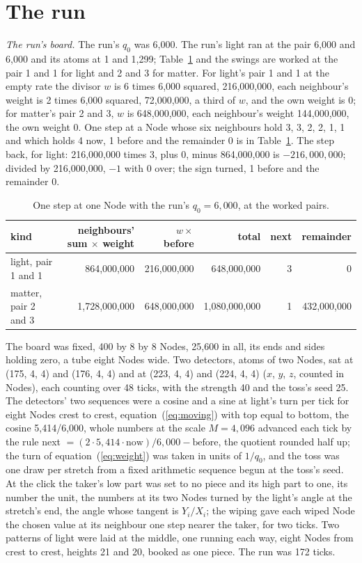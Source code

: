 \documentclass[pdflatex,sn-mathphys-num]{sn-jnl}
\begin{document}
\section{The run}\label{sec:run}

\textit{The run's board.} The run's $q_0$ was 6,000. The run's light ran at the pair 6,000 and 6,000 and its atoms at 1 and 1,299; Table~\ref{tab:step} and the swings are worked at the pair 1 and 1 for light and 2 and 3 for matter. For light's pair 1 and 1 at the empty rate the divisor $w$ is 6 times 6,000 squared, 216,000,000, each neighbour's weight is 2 times 6,000 squared, 72,000,000, a third of $w$, and the own weight is 0; for matter's pair 2 and 3, $w$ is 648,000,000, each neighbour's weight 144,000,000, the own weight 0. One step at a Node whose six neighbours hold 3, 3, 2, 2, 1, 1 and which holds 4 now, 1 before and the remainder 0 is in Table~\ref{tab:step}. The step back, for light: 216,000,000 times 3, plus 0, minus 864,000,000 is $-216{,}000{,}000$; divided by 216,000,000, $-1$ with 0 over; the sign turned, 1 before and the remainder 0.

\begin{table}[!t]\caption{\label{tab:step}One step at one Node with the run's $q_0 = 6{,}000$, at the worked pairs.}
\footnotesize\setlength{\tabcolsep}{4pt}\begin{tabular}{lrrrrr}
\toprule
kind & neighbours' sum $\times$ weight & $w \times$ before & total & next & remainder \\
\midrule
light, pair 1 and 1 & 864,000,000 & 216,000,000 & 648,000,000 & 3 & 0 \\
matter, pair 2 and 3 & 1,728,000,000 & 648,000,000 & 1,080,000,000 & 1 & 432,000,000 \\
\bottomrule
\end{tabular}
\end{table}

The board was fixed, 400 by 8 by 8 Nodes, 25,600 in all, its ends and sides holding zero, a tube eight Nodes wide. Two detectors, atoms of two Nodes, sat at (175, 4, 4) and (176, 4, 4) and at (223, 4, 4) and (224, 4, 4) ($x$, $y$, $z$, counted in Nodes), each counting over 48 ticks, with the strength 40 and the toss's seed 25. The detectors' two sequences were a cosine and a sine at light's turn per tick for eight Nodes crest to crest, equation~(\ref{eq:moving}) with top equal to bottom, the cosine 5,414/6,000, whole numbers at the scale $M = 4{,}096$ advanced each tick by the rule next $= (2 \cdot 5{,}414 \cdot \mathrm{now})/6{,}000 - \mathrm{before}$, the quotient rounded half up; the turn of equation~(\ref{eq:weight}) was taken in units of $1/q_0$, and the toss was one draw per stretch from a fixed arithmetic sequence begun at the toss's seed. At the click the taker's low part was set to no piece and its high part to one, its number the unit, the numbers at its two Nodes turned by the light's angle at the stretch's end, the angle whose tangent is $Y_i/X_i$; the wiping gave each wiped Node the chosen value at its neighbour one step nearer the taker, for two ticks. Two patterns of light were laid at the middle, one running each way, eight Nodes from crest to crest, heights 21 and 20, booked as one piece. The run was 172 ticks.
\end{document}
